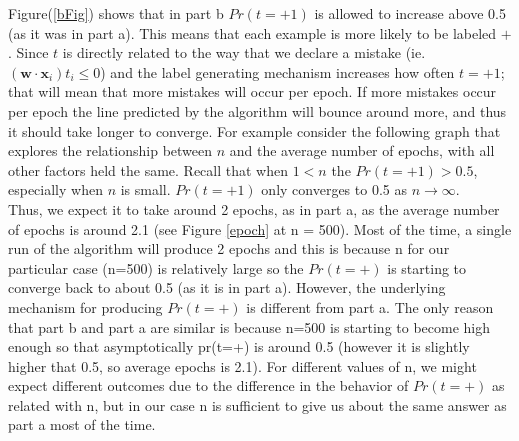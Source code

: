 \documentclass{article}
\begin{document}
Figure(\ref{bFig}) shows that in part b $Pr(t=+1)$ is allowed to increase above 0.5 (as it was in part a).
This means that each example is more likely to be labeled $+$. 
Since $t$ is directly related to the way that we declare a mistake (ie. $(\bm{w\cdot x}_i) t_i \le0$) and the label generating mechanism increases how often $t=+1$; that will mean that more mistakes will occur per epoch. %
If more mistakes occur per epoch the line predicted by the algorithm will bounce around more, and thus it should take longer to converge.
For example consider the following graph that explores the relationship between $n$ and the average number of epochs, with all other factors held the same.
Recall that when $1<n$ the $Pr(t=+1)>0.5$, especially when $n$ is small.
$Pr(t=+1)$ only converges to 0.5 as $n\rightarrow\infty$.
\\

Thus, we expect it to take around 2 epochs, as in part a, as the average number of epochs is around 2.1 (see Figure \ref{epoch} at n = 500). Most of the time, a single run of the algorithm will produce 2 epochs and this is because n for our particular case (n=500) is relatively large so the $Pr(t=+)$ is starting to converge back to about 0.5 (as it is in part a). However, the underlying mechanism for producing $Pr(t=+)$ is different from part a.  The only reason that part b and part a are similar is because n=500 is starting to become high enough so that asymptotically pr(t=+) is around 0.5 (however it is slightly higher that 0.5, so average epochs is 2.1). For different values of n, we might expect different outcomes due to the difference in the behavior of $Pr(t=+)$ as related with n, but in our case n is sufficient to give us about the same answer as part a most of the time.
\end{document}
